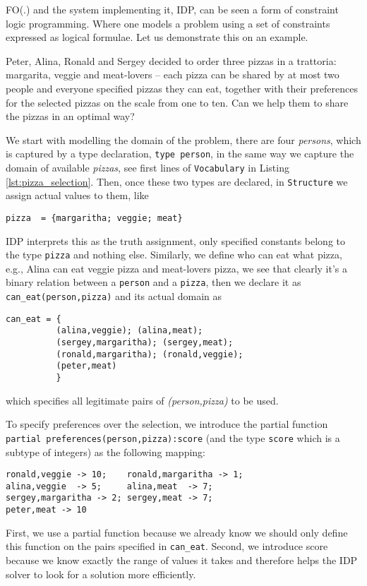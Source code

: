 \pubrev
FO(.) and the system implementing it, IDP, can be seen a form of constraint logic programming. Where one models a problem using a set of constraints expressed as logical formulae. 
Let us demonstrate this on an example. 
\begin{example}\label{example:pizza}
	Peter, Alina, Ronald and Sergey decided to order three pizzas in a trattoria: margarita, veggie and meat-lovers -- each pizza can be shared by at most two people and everyone specified pizzas they can eat, together with their preferences for the selected pizzas on the scale from one to ten. Can we help them to share the pizzas in an optimal way?

    We start with modelling the domain of the problem, there are four \textit{persons}, which is captured by a type declaration, \texttt{type person}, in the same way we capture the domain of available \textit{pizzas}, see first lines of \texttt{Vocabulary} in Listing \ref{lst:pizza_selection}. Then, once these two types are declared, in \texttt{Structure} we assign actual values to them, like
\begin{verbatim}
pizza  = {margaritha; veggie; meat}
\end{verbatim}
    IDP interprets this as the truth assignment, only specified constants belong to the type \texttt{pizza} and nothing else. Similarly, we define who can eat what pizza, e.g., Alina can eat veggie pizza and meat-lovers pizza, we see that clearly it's a binary relation between a \texttt{person} and a \texttt{pizza}, then we declare it as \texttt{can\_eat(person,pizza)} and its actual domain as 
\begin{verbatim}
can_eat = {
          (alina,veggie); (alina,meat); 
          (sergey,margaritha); (sergey,meat);
          (ronald,margaritha); (ronald,veggie);
          (peter,meat)
          }
\end{verbatim}
which specifies all legitimate pairs of \textit{(person,pizza)} to be used.

    
To specify preferences over the selection, we introduce the partial function \texttt{partial preferences(person,pizza):score} (and the type \texttt{score} which is a subtype of integers) as the following mapping:
\begin{verbatim}
ronald,veggie -> 10;    ronald,margaritha -> 1; 
alina,veggie  -> 5;     alina,meat  -> 7;
sergey,margaritha -> 2; sergey,meat -> 7;
peter,meat -> 10
\end{verbatim}
\end{example}
First, we use a partial function because we already know we should only define this function on the pairs specified in \texttt{can\_eat}. Second, we introduce score because we know exactly the range of values it takes and therefore helps the IDP solver to look for a solution more efficiently.

